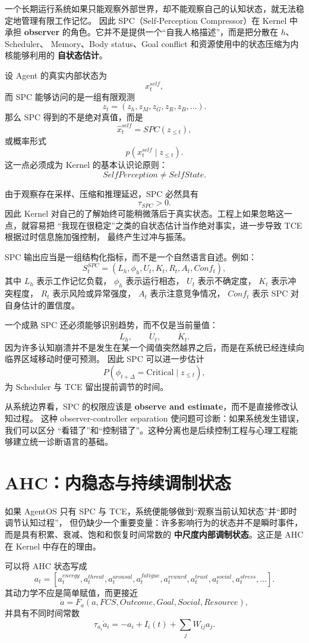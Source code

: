 一个长期运行系统如果只能观察外部世界，却不能观察自己的认知状态，就无法稳定地管理有限工作记忆。
因此 SPC（Self-Perception Compressor）在 Kernel 中承担
\textbf{observer} 的角色。它并不是提供一个``自我人格描述''，而是把分散在 $h$、Scheduler、
Memory、Body status、Goal conflict 和资源使用中的状态压缩为内核能够利用的
\textbf{自状态估计}。

设 Agent 的真实内部状态为
\[
x_t^{self},
\]
而 SPC 能够访问的是一组有限观测
\[
z_t=
(
z_h,z_M,z_G,z_R,z_B,\ldots
).
\]
那么 SPC 得到的不是绝对真值，而是
\[
\hat x_t^{self}
=
SPC(z_{\leq t}),
\]
或概率形式
\[
p(x_t^{self}\mid z_{\leq t}).
\]
这一点必须成为 Kernel 的基本认识论原则：
\[
\boxed{
SelfPerception\neq SelfState.
}
\]

由于观察存在采样、压缩和推理延迟，SPC 必然具有
\[
\tau_{SPC}>0.
\]
因此 Kernel 对自己的了解始终可能稍微落后于真实状态。工程上如果忽略这一点，就容易把
``我现在很稳定''之类的自状态估计当作绝对事实，进一步导致 TCE 根据过时信息施加强控制，
最终产生过冲与振荡。

SPC 输出应当是一组结构化指标，而不是一个自然语言自述。例如：
\[
S_t^{SPC}
=
(
L_h,
\phi_h,
U_t,
K_t,
R_t,
A_t,
Conf_t
),
\]
其中 $L_h$ 表示工作记忆负载，
$\phi_h$ 表示运行相态，
$U_t$ 表示不确定度，
$K_t$ 表示冲突程度，
$R_t$ 表示风险或异常强度，
$A_t$ 表示注意竞争情况，
$Conf_t$ 表示 SPC 对自身估计的置信度。

一个成熟 SPC 还必须能够识别趋势，而不仅是当前量值：
\[
\dot L_h,\qquad
\dot U_t,\qquad
\dot K_t.
\]
因为许多认知崩溃并不是发生在某一个阈值突然越界之后，而是在系统已经连续向临界区域移动时便可预测。
因此 SPC 可以进一步估计
\[
P(\phi_{t+\Delta}=\mathrm{Critical}\mid z_{\leq t}),
\]
为 Scheduler 与 TCE 留出提前调节的时间。

从系统边界看，SPC 的权限应该是
\textbf{observe and estimate}，而不是直接修改认知过程。
这种 observer-controller separation 使问题可诊断：如果系统发生错误，我们可以区分
``看错了''和``控制错了''。这种分离也是后续控制工程与心理工程能够建立统一诊断语言的基础。


\section{AHC：内稳态与持续调制状态}

如果 AgentOS 只有 SPC 与 TCE，系统便能够做到``观察当前认知状态''并``即时调节认知过程''，
但仍缺少一个重要变量：许多影响行为的状态并不是瞬时事件，而是具有积累、衰减、饱和和恢复时间常数的
\textbf{中尺度内部调制状态}。这正是 AHC 在 Kernel 中存在的理由。

可以将 AHC 状态写成
\[
a_t
=
[
a_t^{energy},
a_t^{threat},
a_t^{arousal},
a_t^{fatigue},
a_t^{reward},
a_t^{trust},
a_t^{social},
a_t^{stress},
\ldots
].
\]
其动力学不应是简单赋值，而更接近
\[
\dot a
=
F_a(a,
FCS,
Outcome,
Goal,
Social,
Resource),
\]
并具有不同时间常数
\[
\tau_{a_i}\dot a_i
=
-a_i
+
I_i(t)
+
\sum_j W_{ij}a_j.
\]


